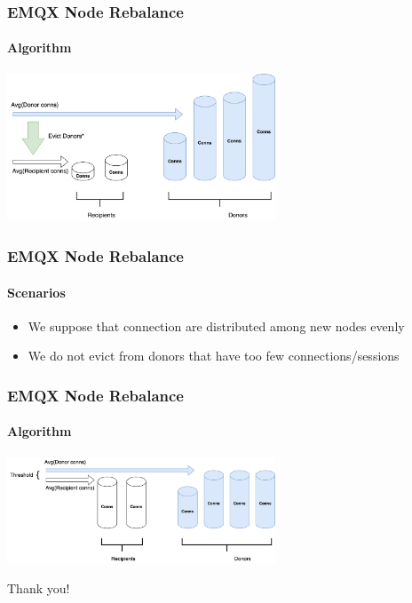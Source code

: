 \documentclass{beamer}
\begin{document}
\begin{frame}
    \frametitle{EMQX Node Rebalance}
    \framesubtitle{Algorithm}
    \begin{center}
        \includegraphics[width=8cm, keepaspectratio]{images/node-rebalance-algo1.png}
    \end{center}
\end{frame}

\begin{frame}
    \frametitle{EMQX Node Rebalance}
    \framesubtitle{Scenarios}
    \begin{itemize}
        \item We suppose that connection are distributed among new nodes evenly
        \item We do not evict from donors that have too few connections/sessions
    \end{itemize}
\end{frame}

\begin{frame}
    \frametitle{EMQX Node Rebalance}
    \framesubtitle{Algorithm}
    \begin{center}
        \includegraphics[width=8cm, keepaspectratio]{images/node-rebalance-algo2.png}
    \end{center}
\end{frame}

\begin{frame}
    \begin{center}
        Thank you!
    \end{center}
\end{frame}
\end{document}
